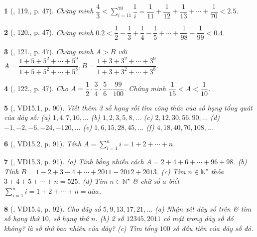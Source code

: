 \documentclass{article}
\newtheorem{baitoan}{}
\begin{document}
\begin{baitoan}[\cite{Binh_Toan_6_tap_2}, 119., p. 47]
	Chứng minh $\dfrac{4}{3} < \sum_{i=11}^{70} \dfrac{1}{i} = \dfrac{1}{11} + \dfrac{1}{12} + \dfrac{1}{13} + \cdots + \dfrac{1}{70} < 2.5$.
\end{baitoan}

\begin{baitoan}[\cite{Binh_Toan_6_tap_2}, 120., p. 47]
	Chứng minh $0.2 < \dfrac{1}{2} - \dfrac{1}{3} + \dfrac{1}{4} - \dfrac{1}{5} + \cdots + \dfrac{1}{98} - \dfrac{1}{99} < 0.4$.
\end{baitoan}

\begin{baitoan}[\cite{Binh_Toan_6_tap_2}, 121., p. 47]
	Chứng minh $A > B$ với $A = \dfrac{1 + 5 + 5^2 + \cdots + 5^9}{1 + 5 + 5^2 + \cdots + 5^8},B = \dfrac{1 + 3 + 3^2 + \cdots + 3^9}{1 + 3 + 3^2 + \cdots + 3^8}$. 
\end{baitoan}

\begin{baitoan}[\cite{Binh_Toan_6_tap_2}, 122., p. 47]
	Cho $A = \dfrac{1}{2}\cdot\dfrac{3}{4}\cdot\dfrac{5}{6}\cdots\dfrac{99}{100}$. Chứng minh $\dfrac{1}{15} < A < \dfrac{1}{10}$.
\end{baitoan}

\begin{baitoan}[\cite{TLCT_THCS_Toan_6_so_hoc}, VD15.1, p. 90]
	Viết thêm 3 số hạng rồi tìm công thức của số hạng tổng quát của dãy số: (a) $1,4,7,10,\ldots$ (b) $1,2,3,5,8,\ldots$ (c) $2,12,30,56,90,\ldots$ (d) $-1,-2,-6,-24,-120,\ldots$ (e) $1,6,15,28,45,\ldots$ (f) $4,18,40,70,108,\ldots$
\end{baitoan}

\begin{baitoan}[\cite{TLCT_THCS_Toan_6_so_hoc}, VD15.2, p. 91]
	Tính $A = \sum_{i=1}^n i = 1 + 2 + \cdots + n$.
\end{baitoan}

\begin{baitoan}[\cite{TLCT_THCS_Toan_6_so_hoc}, VD15.3, p. 91]
	(a) Tính bằng nhiều cách $A = 2 + 4 + 6 + \cdots + 96 + 98$. (b) Tính $B = 1 - 2 + 3 - 4 + \cdots + 2011 - 2012 + 2013$. (c) Tìm $n\in\mathbb{N}^\star$ thỏa $3 + 4 + 5 + \cdots + n = 525$. (d) Tìm $n\in\mathbb{N}^\star$ \& chữ số $a$ biết $\sum_{i=1}^n i = 1 + 2 + \cdots + n = \overline{aaa}$.
\end{baitoan}

\begin{baitoan}[\cite{TLCT_THCS_Toan_6_so_hoc}, VD15.4, p. 92]
	Cho dãy số $5,9,13,17,21,\ldots$ (a) Nhận xét dãy số trên \& tìm số hạng thứ $10$, số hạng thứ $n$. (b) 2 số $12345,2011$ có mặt trong dãy số đó không? là số thứ bao nhiêu của dãy? (c) Tìm tổng $100$ số đầu tiên của dãy số đó.
\end{baitoan}
\end{document}
